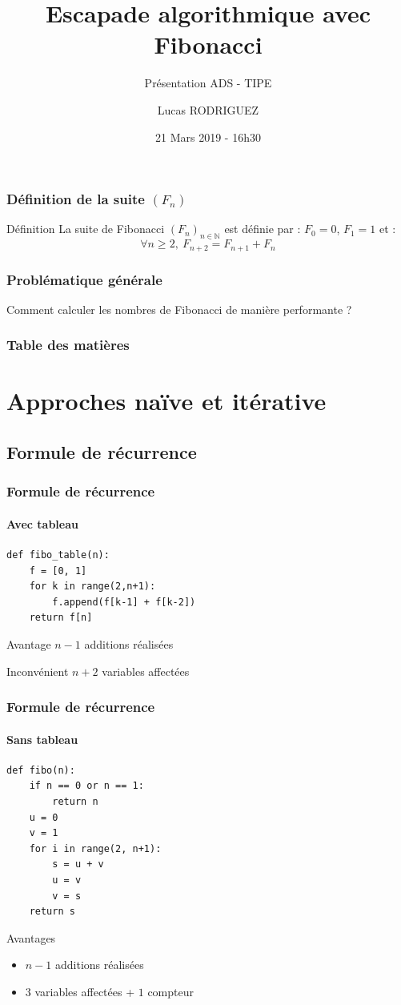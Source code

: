 \documentclass[10pt]{beamer}
\author{Lucas RODRIGUEZ}
\title{Escapade algorithmique avec Fibonacci}
\subtitle{Présentation ADS - TIPE}
\date{21 Mars 2019 - 16h30}
\begin{document}
\begin{frame}
\titlepage
\end{frame}

\begin{frame}
\frametitle{Définition de la suite $(F_n)$}
\begin{block}{Définition}
La suite de Fibonacci $(F_n)_{n \in \mathbb{N}} $ est définie par : $F_0 = 0$, $F_1 = 1$ et :
\[
   \forall n \geq 2, \ F_{n+2} = F_{n+1} + F_n
\]
\end{block}
\end{frame}

\begin{frame}
\frametitle{Problématique générale}
\begin{center}
\begin{large}
Comment calculer les nombres de Fibonacci de manière performante ?
\end{large}
\end{center}
\end{frame}

\begin{frame}
\frametitle{Table des matières}
\tableofcontents
\end{frame}

\section{Approches naïve et itérative}
\subsection{Formule de récurrence}


\begin{frame}[fragile]
\frametitle{Formule de récurrence}
\framesubtitle{Avec tableau}
\begin{verbatim}
def fibo_table(n):
    f = [0, 1]
    for k in range(2,n+1):
        f.append(f[k-1] + f[k-2])
    return f[n]
\end{verbatim}
\begin{exampleblock}{Avantage}
$n-1$ additions réalisées
\end{exampleblock}
\begin{alertblock}{Inconvénient}
$n + 2$ variables affectées
\end{alertblock}
\end{frame}


\begin{frame}[fragile]
\frametitle{Formule de récurrence}
\framesubtitle{Sans tableau}
\begin{verbatim}
def fibo(n):
    if n == 0 or n == 1:
        return n
    u = 0
    v = 1
    for i in range(2, n+1):
        s = u + v
        u = v
        v = s
    return s
\end{verbatim}
\begin{exampleblock}{Avantages}
\begin{itemize}
\item $n-1$ additions réalisées 
\item $3$ variables affectées + $1$ compteur
\end{itemize}
\end{exampleblock}
\end{frame}
\end{document}
